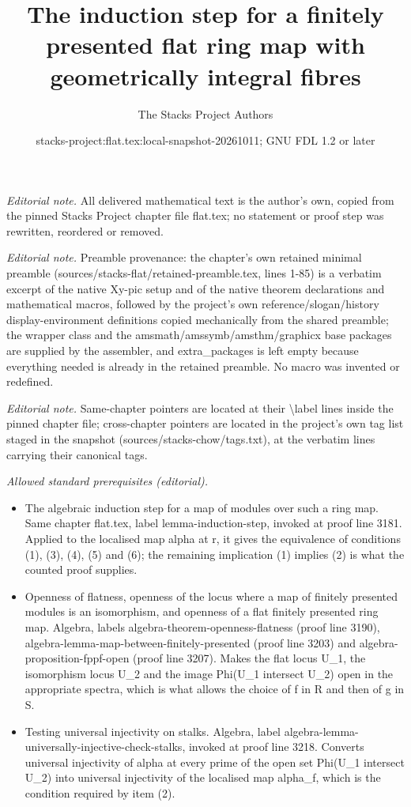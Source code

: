 \documentclass[10pt,a4paper]{amsart}
\title{The induction step for a finitely presented flat ring map with geometrically integral fibres}
\author{The Stacks Project Authors}
\date{stacks-project:flat.tex:local-snapshot-20261011; GNU FDL 1.2 or later}
\theoremstyle{plain}
\theoremstyle{definition}
\theoremstyle{remark}
\numberwithin{equation}{subsection}
\begin{document}
\maketitle
\noindent\textit{Editorial note.} All delivered mathematical text is the author's own, copied from the pinned Stacks Project chapter file flat.tex; no statement or proof step was rewritten, reordered or removed.\par\medskip
\noindent\textit{Editorial note.} Preamble provenance: the chapter's own retained minimal preamble (sources/stacks-flat/retained-preamble.tex, lines 1-85) is a verbatim excerpt of the native Xy-pic setup and of the native theorem declarations and mathematical macros, followed by the project's own reference/slogan/history display-environment definitions copied mechanically from the shared preamble; the wrapper class and the amsmath/amssymb/amsthm/graphicx base packages are supplied by the assembler, and extra\_packages is left empty because everything needed is already in the retained preamble. No macro was invented or redefined.\par\medskip
\noindent\textit{Editorial note.} Same-chapter pointers are located at their \textbackslash{}label lines inside the pinned chapter file; cross-chapter pointers are located in the project's own tag list staged in the snapshot (sources/stacks-chow/tags.txt), at the verbatim lines carrying their canonical tags.\par\medskip
\noindent\textit{Allowed standard prerequisites (editorial).}\begin{itemize}
\item The algebraic induction step for a map of modules over such a ring map. Same chapter flat.tex, label lemma-induction-step, invoked at proof line 3181. Applied to the localised map alpha at r, it gives the equivalence of conditions (1), (3), (4), (5) and (6); the remaining implication (1) implies (2) is what the counted proof supplies.
\item Openness of flatness, openness of the locus where a map of finitely presented modules is an isomorphism, and openness of a flat finitely presented ring map. Algebra, labels algebra-theorem-openness-flatness (proof line 3190), algebra-lemma-map-between-finitely-presented (proof line 3203) and algebra-proposition-fppf-open (proof line 3207). Makes the flat locus U\_1, the isomorphism locus U\_2 and the image Phi(U\_1 intersect U\_2) open in the appropriate spectra, which is what allows the choice of f in R and then of g in S.
\item Testing universal injectivity on stalks. Algebra, label algebra-lemma-universally-injective-check-stalks, invoked at proof line 3218. Converts universal injectivity of alpha at every prime of the open set Phi(U\_1 intersect U\_2) into universal injectivity of the localised map alpha\_f, which is the condition required by item (2).
\end{itemize}\medskip
\end{document}
